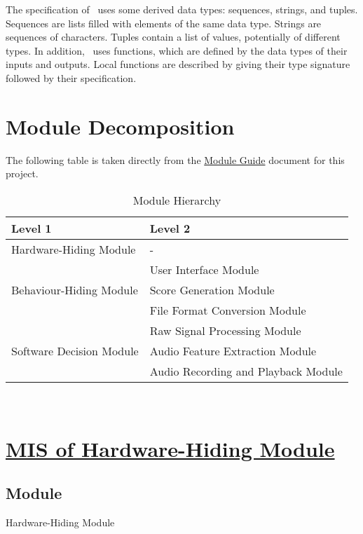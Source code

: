 \documentclass[12pt, titlepage]{article}
\begin{document}
\noindent
The specification of \progname \ uses some derived data types: sequences, strings, and
tuples. Sequences are lists filled with elements of the same data type. Strings
are sequences of characters. Tuples contain a list of values, potentially of
different types. In addition, \progname \ uses functions, which
are defined by the data types of their inputs and outputs. Local functions are
described by giving their type signature followed by their specification.

\section{Module Decomposition}

The following table is taken directly from the \href{https://github.com/emilyperica/ScoreGen/blob/main/docs/Design/SoftArchitecture/MG.pdf}{Module Guide} document for this project.

\begin{table}[h!]
  \centering
  \begin{tabular}{p{} p{}}
  \toprule
  \textbf{Level 1} & \textbf{Level 2}\\
  \midrule

  {Hardware-Hiding Module} & -\\
  \midrule

  \multirow{3}{0.3\textwidth}{Behaviour-Hiding Module} 
  & User Interface Module \\
  & Score Generation Module \\
  & File Format Conversion Module \\
  \midrule

  \multirow{3}{0.3\textwidth}{Software Decision Module} 
  & Raw Signal Processing Module \\
  & Audio Feature Extraction Module \\
  & Audio Recording and Playback Module \\
  \bottomrule

  \end{tabular}
  \caption{Module Hierarchy}
  \label{TblMH}
\end{table}

\newpage
~\newpage

\section{\hyperref[mHH]{MIS of Hardware-Hiding Module}} \label{M1}

\subsection{Module}  
Hardware-Hiding Module  
\end{document}

